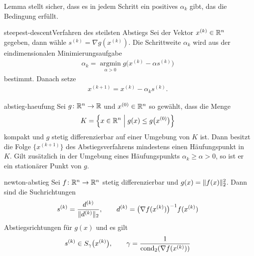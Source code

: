 \begin{remark}
  Lemma  stellt sicher, dass es in
  jedem Schritt ein positives $\alpha_k$ gibt, das die Bedingung
  erfüllt.
\end{remark}

\begin{Beispiel*}{steepest-descent}{Verfahren des steilsten Abstiegs}
  Sei der Vektor $x^{(k)} \in\mathbb R^n$ gegeben, dann wähle
  $s^{(k)} = \nabla g(x^{(k)})$. Die Schrittweite $\alpha_k$ wird aus
  der eindimensionalen Minimierungsaufgabe
  \begin{gather}
    \alpha_k = \operatorname*{argmin}_{\alpha>0}
    g\bigl(x^{(k)} - \alpha s^{(k)}\bigr)
  \end{gather}
  bestimmt. Danach setze
  \begin{gather}
    x^{(k+1)} = x^{(k)} - \alpha_k s^{(k)}.
  \end{gather}
\end{Beispiel*}

\begin{Satz}{abstieg-haeufung}
  Sei $g\colon \mathbb R^n\to \mathbb R$ und $x^{(0)} \in\mathbb R^n$ so gewählt, dass die Menge
  \begin{gather}
    K = \Bigl\{x\in\mathbb R^n \; \Big| \; g(x) \le g\bigl(x^{(0)}\bigr) \Bigr\}
  \end{gather}
  kompakt und $g$ stetig differenzierbar auf einer Umgebung von $K$
  ist. Dann besitzt die Folge $\{x^{(k+1)}\}$ des Abstiegsverfahrens
  mindestens einen Häufungspunkt in $K$. Gilt zusätzlich in der
  Umgebung eines Häufungspunkts $\alpha_k \ge \alpha>0$, so ist er
  ein stationärer Punkt von $g$.
\end{Satz}

\begin{Lemma}{newton-abstieg}
  Sei $f\colon \mathbb R^n\to \mathbb R^n$ stetig differenzierbar und
  $g(x) = \lVert f(x)\rVert_2^2$.  Dann sind die Suchrichtungen
  \begin{gather}
    s^{(k)} = \frac{d^{(k)}}{\lVert d^{(k)}\rVert_2},
    \qquad d^{(k)} = \bigl(\nabla f(x^{(k)})\bigr)^{-1}f(x^{(k)})
  \end{gather}
  Abstiegsrichtungen für $g(x)$ und es gilt
  \begin{gather}
    s^{(k)} \in S_\gamma\bigl(x^{(k)}\bigr),
    \qquad
    \gamma = \frac{1}{\operatorname{cond}_2(\nabla f(x^{(k)}))}
  \end{gather}
\end{Lemma}

